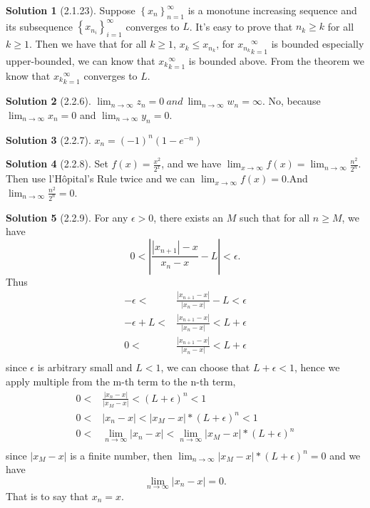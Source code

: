 \documentclass{article}
\theoremstyle{definition}
\newtheorem{sol}{Solution}[exe]
\begin{document}
\begin{sol}[2.1.23]

Suppose $\left\{x_{n}\right\}_{n=1}^{\infty}$ is a monotune increasing sequence and its subsequence $\left\{x_{n_{i}}\right\}_{i=1}^{\infty}$ converges to $L$.
It's easy to prove that $n_{k}\geq k$ for all $k\geq 1$. Then we have that for all $k\geq 1$, $x_{k}\leq x_{n_{k}}$, for ${x_{n_{k}}}_{k=1}^{\infty}$ is bounded especially upper-bounded, we can 
know that ${x_{k}}_{k=1}^{\infty}$ is bounded above. From the theorem we know that ${x_{k}}_{k=1}^{\infty}$ converges to $L$.
\end{sol}

\begin{sol}[2.2.6]

    $\lim_{n\to\infty}z_{n}=0\ and\ \lim_{n\to\infty}w_{n}=\infty$. No, because $\lim_{n\to\infty}x_{n}=0$ and $\lim_{n\to\infty}y_{n}=0$.
\end{sol}

\begin{sol}[2.2.7]

    $x_{n} = (-1)^{n} (1-e^{-n})$
\end{sol}

\begin{sol}[2.2.8]
    Set $f(x)=\frac{x^{2}}{2^{x}}$, and we have $\lim_{x\to\infty}f(x)=\lim_{n\to\infty}\frac{n^{2}}{2^{n}}$.
    Then use l'Hôpital's Rule twice and we can  $\lim_{x\to\infty}f(x)=0$.And $\lim_{n\to\infty}\frac{n^{2}}{2^{n}}=0$.
\end{sol}

\begin{sol}[2.2.9]

    For any $\epsilon>0$, there exists an $M$ such that for all $n\geq M$, we have 
    $$0<|\frac{|x_{n+1}|-x}{x_{n}-x}-L|<\epsilon.$$
    Thus \begin{align*}
        -\epsilon<& \frac{|x_{n+1}-x|}{|x_{n}-x|}-L<\epsilon\\
        -\epsilon+L<& \frac{|x_{n+1}-x|}{|x_{n}-x|}<L+\epsilon\\
        0<& \frac{|x_{n+1}-x|}{|x_{n}-x|}<L+\epsilon\\
    \end{align*}
    since $\epsilon$ is arbitrary small and $L<1$, we can choose that $L+\epsilon<1$, hence we apply multiple from the m-th term to the n-th term, 
    \begin{align*}
        0<& \frac{|x_{n}-x|}{|x_{M}-x|}<(L+\epsilon)^{n}<1\\
        0<& |x_{n}-x|<|x_{M}-x|*{(L+\epsilon)^{n}}<1\\
        0<& \lim_{n\to\infty}|x_{n}-x|<\lim_{n\to\infty}|x_{M}-x|*{(L+\epsilon)^{n}}\\
    \end{align*}
    since $|x_{M}-x|$ is a finite number, then $\lim_{n\to\infty}|x_{M}-x|*{(L+\epsilon)^{n}}=0$ and we have 
    $$\lim_{n\to\infty}|x_{n}-x|=0.$$
    That is to say that $x_{n}=x$.
\end{sol}
\end{document}
